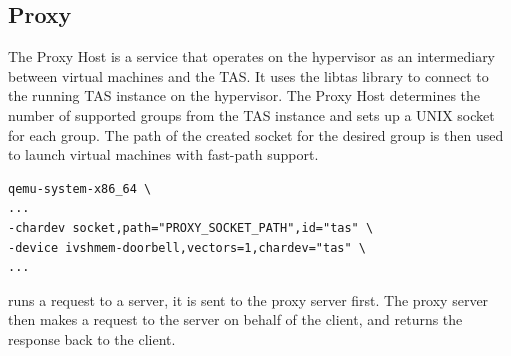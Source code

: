 \subsection{Proxy}

The Proxy Host is a service that operates on the hypervisor as an intermediary between virtual 
machines and the TAS. It uses the libtas library to connect to the running TAS instance on 
the hypervisor. The Proxy Host determines the number of supported groups from the TAS instance 
and sets up a UNIX socket for each group. The path of the created socket for the desired group 
is then used to launch virtual machines with fast-path support.
\begin{lstlisting}[caption={QEMU system x86-64 command with ivshmem-doorbell and socket interface for connection to proxy host},captionpos=b]
qemu-system-x86_64 \
...
-chardev socket,path="PROXY_SOCKET_PATH",id="tas" \
-device ivshmem-doorbell,vectors=1,chardev="tas" \ 
...
\end{lstlisting}

runs a request to a server, it is sent to the proxy server first. The proxy server then makes a request to the server on behalf of the client, and returns the response back to the client.


